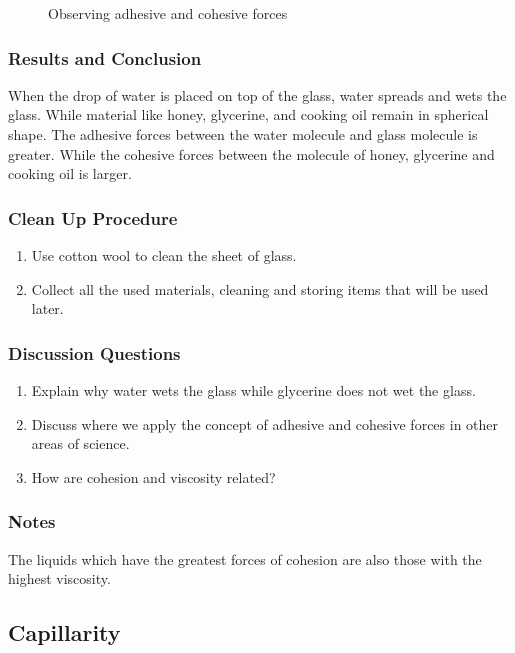 \begin{figure}[h]
\begin{center}
\def\svgwidth{300pt}

\caption{Observing adhesive and cohesive forces}
\label{fig:adhesion-cohesion}
\end{center}
\end{figure}

\subsubsection*{Results and Conclusion}
When the drop of water is placed on top of the glass, water spreads and wets the glass. While material like honey, glycerine, and cooking oil remain in spherical shape. The adhesive forces between the water molecule and glass molecule is greater. While the cohesive forces between the molecule of honey, glycerine and cooking oil is larger.

\subsubsection*{Clean Up Procedure}
\begin{enumerate}
\item{Use cotton wool to clean the sheet of glass.}
\item{Collect all the used materials, cleaning and storing items that will be used later.}
\end{enumerate}

\subsubsection*{Discussion Questions}
\begin{enumerate}
\item{Explain why water wets the glass while glycerine does not wet the glass.}
\item{Discuss where we apply the concept of adhesive and cohesive forces in other areas of science.}
\item{How are cohesion and viscosity related?}
\end{enumerate}

\subsubsection*{Notes}
The liquids which have the greatest forces of cohesion are also those with the highest viscosity.

\subsection{Capillarity}

